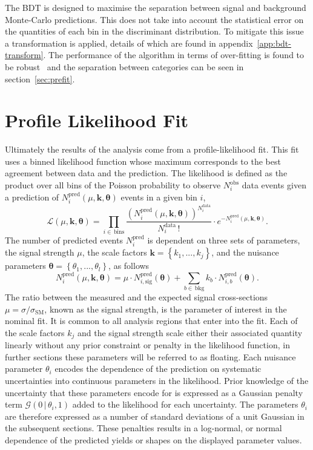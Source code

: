The BDT is designed to maximise the separation between signal and background
Monte-Carlo predictions. This does not take into account the statistical error
on the quantities of each bin in the discriminant distribution. To mitigate this
issue a transformation is applied, details of which are found in
appendix~\ref{app:bdt-transform}. The performance of the algorithm in terms of
over-fitting is found to be robust~\cite{VHMainNote2019} and the separation
between categories can be seen in section~\ref{sec:prefit}.

\section{Profile Likelihood Fit}%
\label{sec:plf}

Ultimately the results of the analysis come from a profile-likelihood fit. This
fit uses a binned likelihood function whose maximum corresponds to the best
agreement between data and the prediction. The likelihood is defined as the
product over all bins of the Poisson probability to observe $N^{\text{obs}}_i$ data
events given a prediction of $N^{\text{pred}}_i(\mu,\bm{k},{\bm\theta})$
events in a given bin $i$,
\begin{equation}
  \mathcal{L}(\mu,{\bm{k},\bm{\theta}}) =
  \prod_{i\in\,\text{bins}} \frac{\left( N_{i}^{\text{pred}}(\mu,{\bm{k,\theta}})
    \right)^{N_{i}^{\text{data}}}}{N_{i}^{\text{data}}\,!}
  \cdot e^{-N_{i}^{\text{pred}}(\mu,{\bm{k,\theta}})}.
  \label{eq:likelihood}
\end{equation}
The number of predicted events $N^{\text{pred}}_i$  is dependent on three sets of
parameters, the signal strength $\mu$, the scale factors $\bm{k}=\left\{k_1,
  ...,k_j\right\}$, and the nuisance parameters  $\bm{\theta} =
\left\{\theta_1,...,\theta_l\right\}$, as follows
\begin{equation}
  N_{i}^{\text{pred}}(\mu,\bm{k},\bm{\theta}) =
  \mu \cdot N_{i,\text{sig}}^{\text{pred}}(\bm{\theta}) +
  \sum_{b\in\,\text{bkg}} k_b\cdot N_{i,b}^{\text{pred}}(\bm{\theta}).
\end{equation}
The ratio between the measured and the expected signal cross-sections
$\mu=\sigma/\sigma_{\text{SM}}$, known as the signal strength, is the parameter
of interest in the nominal fit. It is common to all analysis regions that enter
into the fit. Each of the scale factors $k_j$ and the signal strength scale
either their associated quantity linearly without any prior constraint or
penalty in the likelihood function, in further sections these parameters will be
referred to as floating. Each nuisance parameter $\theta_i$ encodes the
dependence of the prediction on systematic uncertainties into continuous
parameters in the likelihood. Prior knowledge of the uncertainty that these
parameters encode for is expressed as a Gaussian penalty term
$\mathcal{G}(0\,|\,\theta_i,1)$ added to the likelihood for each uncertainty.
The parameters $\theta_i$ are therefore expressed as a number of standard
deviations of a unit Gaussian in the subsequent sections. These penalties
results in a log-normal, or normal dependence of the predicted yields or shapes
on the displayed parameter values.

